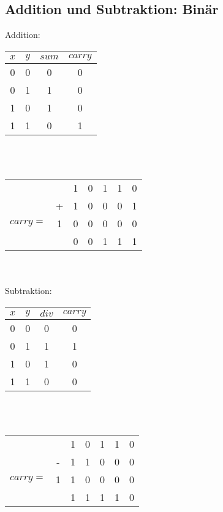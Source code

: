 \subsection{Addition und Subtraktion: Binär}

Addition:\\

\begin{tabular}{c|c|c|c}
$x$ & $y$ & $sum$ & $carry$\\
\hline
0 & 0 & 0 & 0\\
0 & 1 & 1 & 0\\
1 & 0 & 1 & 0\\
1 & 1 & 0 & 1\\
\end{tabular}\
\\~\\

\begin{tabular}{ccccccc}
&   & 1 & 0 & 1 & 1 & 0\\
& + & 1 & 0 & 0 & 0 & 1\\
\hline
$carry =$ & 1 & 0 & 0 & 0 & 0 & 0\\
\hline
& & 0 & 0 & 1 & 1 & 1
\end{tabular}\
\\~\\

Subtraktion:\\

\begin{tabular}{c|c|c|c}
$x$ & $y$ & $div$ & $carry$\\
\hline
0 & 0 & 0 & 0\\
0 & 1 & 1 & 1\\
1 & 0 & 1 & 0\\
1 & 1 & 0 & 0\\
\end{tabular}\
\\~\\

\begin{tabular}{ccccccc}
&   & 1 & 0 & 1 & 1 & 0\\
& - & 1 & 1 & 0 & 0 & 0\\
\hline
$carry =$ & 1 & 1 & 0 & 0 & 0 & 0\\
\hline
& & 1 & 1 & 1 & 1 & 0
\end{tabular}